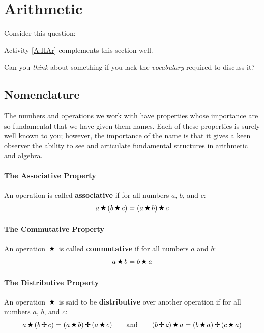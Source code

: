 \section{Arithmetic}\label{S:aritmetic}

Consider this question:
\begin{activitynote}
Activity \ref{A:HAr} complements this section well.  %
\end{activitynote}
\begin{question}
Can you \textit{think} about something if you lack the
\textit{vocabulary} required to discuss it?
\end{question}
\QM

\subsection{Nomenclature}
The numbers and operations we work with have properties whose
importance are so fundamental that we have given them names. Each of
these properties is surely well known to you; however, the importance
of the name is that it gives a keen observer the ability to see and
articulate fundamental structures in arithmetic and algebra.

\paragraph{The Associative Property} 
An operation  is called \textbf{associative} if for all
numbers $a$, $b$, and $c$:
\[
a \,\text{\ding{72}}\, (b \,\text{\ding{72}}\, c) = (a \,\text{\ding{72}}\, b) \,\text{\ding{72}}\, c
\]


\paragraph{The Commutative Property}
An operation $\,\text{\ding{72}}\,$ is called \textbf{commutative} if for all
numbers $a$ and $b$:
\[
a \,\text{\ding{72}}\, b = b \,\text{\ding{72}}\, a
\]

\paragraph{The Distributive Property}
An operation $\,\text{\ding{72}}\,$ is said to be \textbf{distributive} over another
operation  if for all numbers $a$, $b$, and $c$:
\[
a \,\text{\ding{72}}\,(b \,\text{\ding{66}}\, c)  = (a \,\text{\ding{72}}\, b) \,\text{\ding{66}}\, (a\,\text{\ding{72}}\, c)
\qquad\text{and}\qquad (b \,\text{\ding{66}}\, c)\,\text{\ding{72}}\, a  = (b \,\text{\ding{72}}\, a) \,\text{\ding{66}}\, (c\,\text{\ding{72}}\, a)
\]

